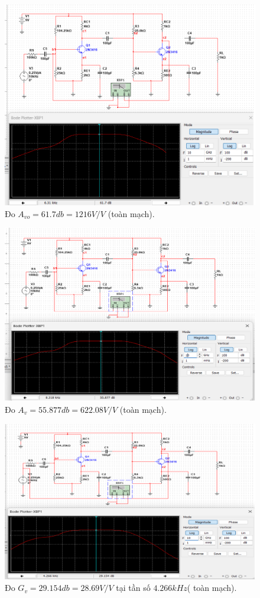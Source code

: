 \begin{itemize}[label=-]
\begin{figure}[H]
		\centering
		\includegraphics[width=.8\linewidth]{./my-chapters/my-images/Question10/b_ketqua_3.png}
		\caption{Đo $A_{vo} = 61.7db = 1216 V/V$ (toàn mạch).}
	\end{figure}
	\begin{figure}[H]
		\centering
		\includegraphics[width=.8\linewidth]{./my-chapters/my-images/Question10/b_ketqua_4.png}
		\caption{Đo $A_{v} = 55.877db = 622.08 V/V$ (toàn mạch).}
	\end{figure}
	\begin{figure}[H]
		\centering
		\includegraphics[width=.8\linewidth]{./my-chapters/my-images/Question10/b_ketqua_5.png}
		\caption{Đo $G_{v} = 29.154db = 28.69V/V$  tại tần số $4.266 kHz$( toàn mạch).}
	\end{figure}
\end{itemize}

